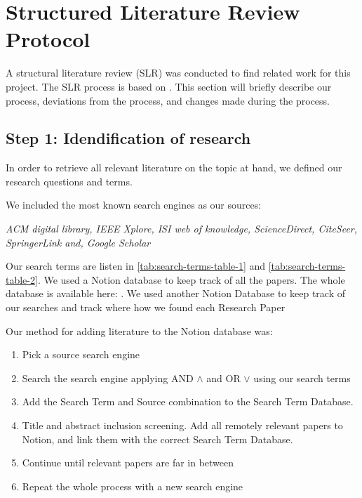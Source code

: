 
\section{Structured Literature Review Protocol}
\label{section:BT:SLR}

A structural literature review (SLR) was conducted to find related work for this project.
The SLR process is based on \cite{AndersKofod-Petersen2018}.
This section will briefly describe our process, deviations from the process,
and changes made during the process.

\subsection{Step 1: Idendification of research}
In order to retrieve all relevant literature on the topic at hand, we defined our
research questions and terms.

We included the most known search engines as our sources:

\textit{
ACM digital library,
IEEE Xplore,
ISI web of knowledge,
ScienceDirect,
CiteSeer,
SpringerLink and,
Google Scholar
}

Our search terms are listen in \autoref{tab:search-terms-table-1} and \autoref{tab:search-terms-table-2}.
We used a Notion database to keep track of all the papers. The whole database is available here: \cite{slrdatabase}.
We used another Notion Database to keep track of our searches and track where how we found each Research Paper
\cite{searchtermtable}

Our method for adding literature to the Notion database was:
\begin{enumerate}
    \item Pick a source search engine
    \item Search the search engine applying AND $\wedge$ and OR $\vee$ using our search terms
    \item Add the Search Term and Source combination to the Search Term Database.
    \item Title and abstract inclusion screening. Add all remotely relevant papers to Notion, and link them with the correct Search Term Database.
    \item Continue until relevant papers are far in between
    \item Repeat the whole process with a new search engine
\end{enumerate}

